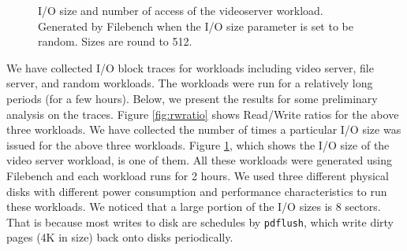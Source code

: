 \begin{figure}[ht]
\begin{centering}
\caption{I/O size and number of access of the videoserver workload.
Generated by Filebench when the I/O size parameter is set to be
random. Sizes are round to 512.}
\label{fig:randomiosize}
\end{centering}
\end{figure}

We have collected I/O block traces for workloads including video
server, file server, and random workloads. The workloads were run for
a relatively long periods (for a few hours). Below, we present the
results for some preliminary analysis on the traces. Figure
\ref{fig:rwratio} shows Read/Write ratios for the above three
workloads.  We have collected the number of times a particular I/O
size was issued for the above three workloads. Figure
\ref{fig:randomiosize}, which shows the I/O size of the video server
workload, is one of them. All these workloads were generated using
Filebench and each workload runs for 2 hours. We used three different
physical disks with different power consumption and performance
characteristics to run these workloads.  We noticed that a large
portion of the I/O sizes is 8 sectors. That is because most writes to
disk are schedules by \texttt{pdflush}, which write dirty pages (4K in
size) back onto disks periodically. 


